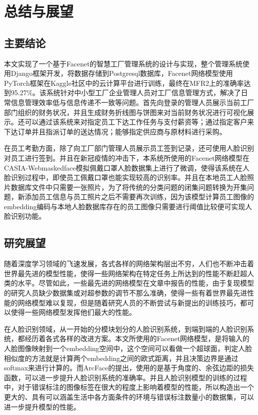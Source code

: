 \section{总结与展望}

\subsection{主要结论}

本文实现了一个基于Facenet的智慧工厂管理系统的设计与实现，整个管理系统使用Django框架开发，将数据存储到Postgresql数据库，Facenet网络模型使用PyTorch框架在Kaggle社区中的云计算平台进行训练，最终在MFR2上的准确率达到95.27\%。该系统针对中小型工厂企业管理人员对工厂信息管理方式，解决了日常信息管理效率低与信息传递不一致等问题。首先向登录的管理人员展示当前工厂部门组织的财务状况，并且生成财务折线图与饼图来对当前财务状况进行可视化展示。还可以通过该系统来对指定员工下达工作任务与支付薪资等；通过指定客户来下达订单并且指派订单的送达情况；能够指定供应商与原材料进行采购。

在员工考勤方面，除了向工厂部门管理人员展示员工签到记录，还可使用人脸识别对员工进行签到。并且在新冠疫情的冲击下，本系统所使用的Facenet网络模型在CASIA-Webmaskedface模拟佩戴口罩人脸数据集上进行了微调，使得该系统在人脸识别过程中，即使员工佩戴口罩也能实现较高的识别率。并且在本地员工人脸照片数据库文件中只需要一张照片，为了将传统的分类问题的闭集问题转换为开集问题，新添加员工信息与员工照片之后不需要再次训练，因为该模型计算员工图像的embedding编码与本地人脸数据库存在的员工图像只需要进行阈值比较便可实现人脸识别功能。

\subsection{研究展望}

随着深度学习领域的飞速发展，各式各样的网络架构层出不穷，人们也不断冲击着世界最先进的模型性能，使得一些网络架构在特定任务上所达到的性能不断赶超人类的水平。尽管如此，一些最先进的网络模型在文章中报告的性能，由于复现模型的研究人员缺少数据集或对超参数的调节不那么准确，使得一些有着世界最先进性能的网络模型难以复现，但是随着研究人员的不断尝试与新提出的训练技巧，都可以使得一些网络模型发挥他们最大的性能。

在人脸识别领域，从一开始的分模块划分的人脸识别系统，到端到端的人脸识别系统，都经历着各式各样的改进方案。本文所使用的Facenet网络模型，是将输入的人脸图像映射到一个embedding空间中，这个空间可以看做一个超球面，判定人脸相似度的方法就是计算两个embedding之间的欧式距离，并且决策边界是通过softmax来进行计算的。而ArcFace\cite{arcface}的提出，使用的是基于角度的、余弦边距的损失函数，可以进一步提升人脸识别系统的准确率。并且人脸识别模型的训练的过程中，对于错误标注的图像标签在很大的程度上影响着模型的性能，所以构造出一个更大的、具有可以涵盖生活中各方面条件的环境与错误标注数量小的数据集，可以进一步提升模型的性能。